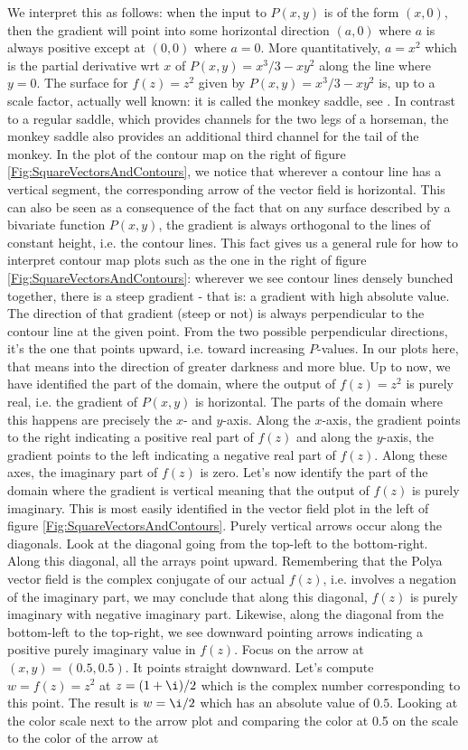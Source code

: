 \documentclass[12pt]{article}
\begin{document}
We interpret this as follows: when the input to $P(x,y)$ is of the form $(x,0)$, then the gradient will point into some horizontal direction $(a,0)$ where $a$ is always positive except at $(0,0)$ where $a=0$. More quantitatively, $a=x^2$ which is the partial derivative wrt $x$ of $P(x,y) = x^3/3 - x y^2$ along the line where $y=0$. The surface for $f(z) = z^2$ given by $P(x,y) = x^3/3 - x y^2$ is, up to a scale factor, actually well known: it is called the monkey saddle, see \cite{MonkeySaddleWiki}. In contrast to a regular saddle, which provides channels for the two legs of a horseman, the monkey saddle also provides an additional third channel for the tail of the monkey. In the plot of the contour map on the right of figure \ref{Fig:SquareVectorsAndContours}, we notice that wherever a contour line has a vertical segment, the corresponding arrow of the vector field is horizontal. This can also be seen as a consequence of the fact that on any surface described by a bivariate function $P(x,y)$, the gradient is always orthogonal to the lines of constant height, i.e. the contour lines. This fact gives us a general rule for how to interpret contour map plots such as the one in the right of figure \ref{Fig:SquareVectorsAndContours}: wherever we see contour lines densely bunched together, there is a steep gradient - that is: a gradient with high absolute value. The direction of that gradient (steep or not) is always perpendicular to the contour line at the given point. From the two possible perpendicular directions, it's the one that points upward, i.e. toward increasing $P$-values. In our plots here, that means into the direction of greater darkness and more blue. Up to now, we have identified the part of the domain, where the output of $f(z) = z^2$ is purely real, i.e. the gradient of $P(x,y)$ is horizontal. The parts of the domain where this happens are precisely the $x$- and $y$-axis. Along the $x$-axis, the gradient points to the right indicating a positive real part of $f(z)$ and along the $y$-axis, the gradient points to the left indicating a negative real part of $f(z)$. Along these axes, the imaginary part of $f(z)$ is zero. Let's now identify the part of the domain where the gradient is vertical meaning that the output of $f(z)$ is purely imaginary. This is most easily identified in the vector field plot in the left of figure \ref{Fig:SquareVectorsAndContours}. Purely vertical arrows occur along the diagonals. Look at the diagonal going from the top-left to the bottom-right. Along this diagonal, all the arrays point upward. Remembering that the Polya vector field is the complex conjugate of our actual $f(z)$, i.e. involves a negation of the imaginary part, we may conclude that along this diagonal, $f(z)$ is purely imaginary with negative imaginary part. Likewise, along the diagonal from the bottom-left to the top-right, we see downward pointing arrows indicating a positive purely imaginary value in $f(z)$. Focus on the arrow at $(x,y) = (0.5,0.5)$. It points straight downward. Let's compute $w = f(z) = z^2$ at $z = (1 + \i) / 2$ which is the complex number corresponding to this point. The result is $w = \i / 2$ which has an absolute value of $0.5$. Looking at the color scale next to the arrow plot and comparing the color at 0.5 on the scale to the color of the arrow at 
\end{document}
